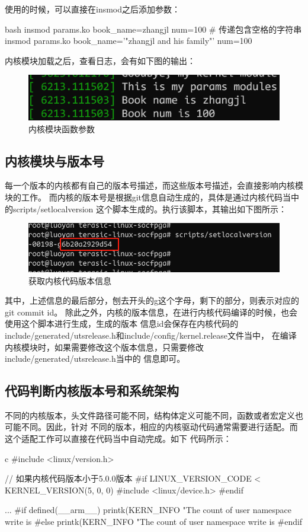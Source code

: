 使用的时候，可以直接在insmod之后添加参数：
\begin{code-block}{bash}
insmod params.ko book_name=zhangjl num=100
# 传递包含空格的字符串
insmod params.ko book_name='"zhangjl and his family"' num=100
\end{code-block}
内核模块加载之后，查看日志，会有如下图的输出：
\begin{figure}[H]
  \centering
  \includegraphics[width=\linewidth]{params_out.png}
  \caption{内核模块函数参数}
  \label{fig:params_out}
\end{figure}

\subsection{内核模块与版本号}
每一个版本的内核都有自己的版本号描述，而这些版本号描述，会直接影响内核模块的工作。
而内核的版本号是根据git信息自动生成的，具体是通过内核代码当中的scripts/setlocalversion
这个脚本生成的。执行该脚本，其输出如下图所示：
\begin{figure}[H]
  \centering
  \includegraphics[width=\linewidth]{version.png}
  \caption{获取内核代码版本信息}
  \label{fig:version}
\end{figure}
其中，上述信息的最后部分，刨去开头的g这个字母，剩下的部分，则表示对应的git commit id。
除此之外，内核的版本信息，在进行内核代码编译的时候，也会使用这个脚本进行生成，生成的版本
信息id会保存在内核代码的include/generated/utsrelease.h和include/config/kernel.release文件当中，
在编译内核模块时，如果需要修改这个版本信息，只需要修改include/generated/utsrelease.h当中的
信息即可。

\subsection{代码判断内核版本号和系统架构}
不同的内核版本，头文件路径可能不同，结构体定义可能不同，函数或者宏定义也可能不同。因此，针对
不同的版本，相应的内核驱动代码通常需要进行适配。而这个适配工作可以直接在代码当中自动完成。如下
代码所示：
\begin{code-block}{c}
#include <linux/version.h>

// 如果内核代码版本小于5.0.0版本
#if LINUX_VERSION_CODE < KERNEL_VERSION(5, 0, 0)
#include <linux/device.h>
#endif

...
#if defined(__arm__)
        printk(KERN_INFO
                "The count of user namespace write is %
#else
        printk(KERN_INFO
                "The count of user namespace write is %
#endif
\end{code-block}

